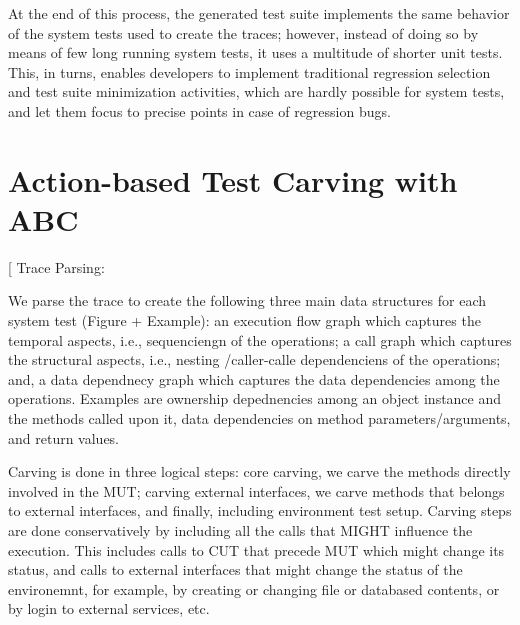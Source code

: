 \documentclass[10pt,conference]{IEEEtran}
\makeatletter
\gdef\xxx{\@ifnextchar[\xxx@lab\xxx@nolab}
\newcommand{\abc}{\textsf{ABC}\xspace}
\makeatother
\begin{document}
\bigskip

At the end of this process, the generated test suite implements the same behavior of the system tests used to create the traces; however, instead of doing so by means of few long running system tests, it uses a multitude of shorter unit tests. This, in turns,
enables developers to implement traditional regression selection and test suite minimization activities, which are hardly possible for system tests, and let them focus to precise points in case of regression bugs.

\section{Action-based Test Carving with \abc}
\xxx{Focus here on the algorithms here}
Trace Parsing:

We parse the trace to create the following three main data structures for each system test (Figure + Example):
an execution flow graph which captures the temporal aspects, i.e., sequenciengn of the operations;
a call graph which captures the structural aspects, i.e., nesting /caller-calle dependenciens of the operations;
and, a data dependnecy graph which captures the data dependencies among the operations. Examples are ownership depednencies among an object instance and the methods called upon it, data dependencies on method parameters/arguments, and return values.

Carving is done in three logical steps: core carving, we carve the methods directly involved in the MUT; carving external interfaces, we carve methods that belongs to external interfaces, and finally,  including environment test setup. Carving steps are done conservatively by including all the calls that MIGHT influence the execution. This includes calls to CUT that precede MUT which might change its status, and calls to external interfaces that might change the status of the environemnt, for example, by creating or changing file or databased contents, or by login to external services, etc. 
\end{document}
